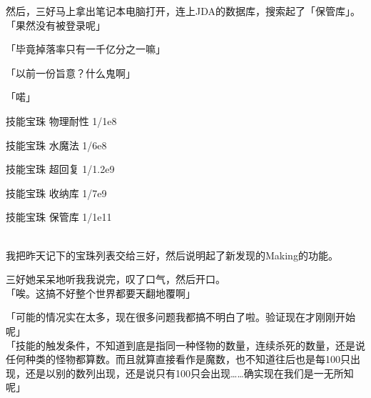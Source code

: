 然后，三好马上拿出笔记本电脑打开，连上JDA的数据库，搜索起了「保管库」。\\

「果然没有被登录呢」

「毕竟掉落率只有一千亿分之一嘛」

「以前一份旨意？什么鬼啊」

「喏」\\

\cardline

  技能宝珠	物理耐性		1/1e8

  技能宝珠	水魔法		1/6e8

  技能宝珠	超回复		1/1.2e9

  技能宝珠	收纳库		1/7e9

  技能宝珠	保管库		1/1e11

\cardline\\


我把昨天记下的宝珠列表交给三好，然后说明起了新发现的Making的功能。

三好她呆呆地听我我说完，叹了口气，然后开口。\\

「唉。这搞不好整个世界都要天翻地覆啊」

「可能的情况实在太多，现在很多问题我都搞不明白了啦。验证现在才刚刚开始呢」\\

「技能的触发条件，不知道到底是指同一种怪物的数量，连续杀死的数量，还是说任何种类的怪物都算数。而且就算直接看作是魔数，也不知道往后也是每100只出现，还是以别的数列出现，还是说只有100只会出现……确实现在我们是一无所知呢」

